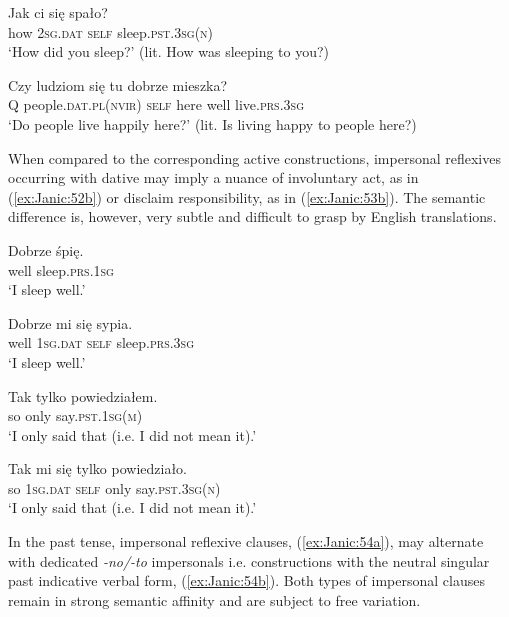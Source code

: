 \documentclass[output=paper]{langscibook}
\begin{document}
\ea \label{ex:Janic:50}
\gll Jak	 ci		 się	 spało?\\
	 how		\textsc{2sg.dat}	\textsc{self}	sleep.\textsc{pst.3sg(n)}\\
\glt ‘How did you sleep?’ (lit. How was sleeping to you?)
\z 
	
\ea \label{ex:Janic:51}
\gll Czy	 ludziom	 się	 tu	 dobrze	mieszka?\\
 	Q		people.\textsc{dat.pl(nvir)}	\textsc{self}	here	well	live.\textsc{prs.3sg}	\\
\glt ‘Do people live happily here?’ (lit. Is living happy to people here?)	 \citep[60]{Bielec1998} 
\z 
		
When compared to the corresponding active constructions, impersonal reflexives occurring with dative may imply a nuance of involuntary act, as in (\ref{ex:Janic:52b}) or disclaim responsibility, as in (\ref{ex:Janic:53b}). The semantic difference is, however, very subtle and difficult to grasp by English translations. 

\ea 
\label{ex:Janic:52}

\ea 
\label{ex:Janic:52a}
\gll Dobrze 	śpię.\\
		well	sleep.\textsc{prs.1sg}\\
\glt ‘I sleep well.’

\ex \label{ex:Janic:52b}
\gll Dobrze	mi	 się		 sypia.\\
		well	\textsc{1sg.dat}	\textsc{self}	sleep.\textsc{prs.3sg}\\	
\glt ‘I sleep well.’
\z 
\z 

\ea \label{ex:Janic:53}
\ea \label{ex:Janic:53a}
\gll Tak	 tylko	powiedziałem.\\
		so		only	say.\textsc{pst.1sg(m)}	\\	
\glt ‘I only said that (i.e. I did not mean it).’

\ex \label{ex:Janic:53b}	
\gll Tak	mi	 się		 tylko	powiedziało.\\
		so	\textsc{1sg.dat}	\textsc{self}	only	say.\textsc{pst.3sg(n)}	\\
\glt ‘I only said that (i.e. I did not mean it).’				\citep[312]{Swan2002}
\z 
\z
	
In the past tense, impersonal reflexive clauses, (\ref{ex:Janic:54a}), may alternate with dedicated \textit{-no/-to} impersonals i.e. constructions with the neutral singular past indicative verbal form, (\ref{ex:Janic:54b}). Both types of impersonal clauses remain in strong semantic affinity and are subject to free variation.
\end{document}
